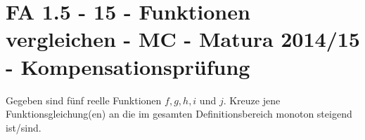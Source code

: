 \section{FA 1.5 - 15 - Funktionen vergleichen - MC - Matura 2014/15 - Kompensationsprüfung}

\begin{beispiel}[FA 1.5]{1} %
				Gegeben sind fünf reelle Funktionen $f,g,h,i$ und $j$. Kreuze jene Funktionsgleichung(en) an die im gesamten Definitionsbereich monoton steigend ist/sind.
				
\end{beispiel}
